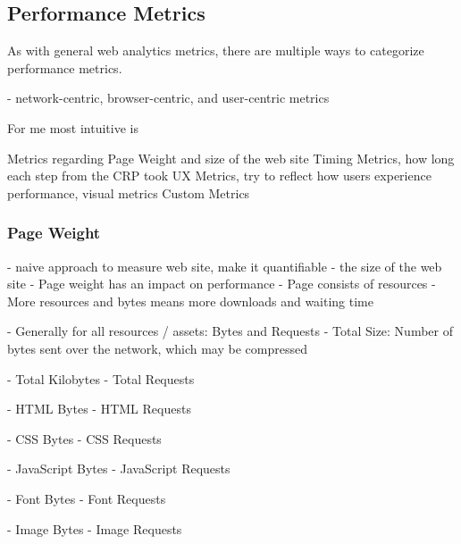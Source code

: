 


\subsection{Performance Metrics}




As with general web analytics metrics, there are multiple ways to categorize performance metrics.

- network-centric, browser-centric, and user-centric metrics

For me most intuitive is

Metrics regarding Page Weight and size of the web site
Timing Metrics, how long each step from the CRP took
UX Metrics, try to reflect how users experience performance, visual metrics
Custom Metrics







\subsubsection{Page Weight}

- naive approach to measure web site, make it quantifiable
- the size of the web site
- Page weight has an impact on performance
- Page consists of resources
- More resources and bytes means more downloads and waiting time


- Generally for all resources / assets: Bytes and Requests
- Total Size: Number of bytes sent over the network, which may be compressed

- Total Kilobytes
- Total Requests

- HTML Bytes
- HTML Requests

- CSS Bytes
- CSS Requests

- JavaScript Bytes
- JavaScript Requests

- Font Bytes
- Font Requests

- Image Bytes
- Image Requests

